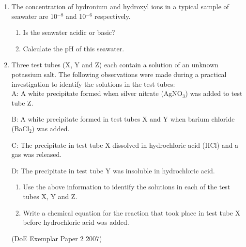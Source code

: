 {\begin{enumerate}
\begin{enumerate}
{(IEB Paper 2, 2003)
}

	\item{The following substances are dissolved in water. Which one of the solutions is basic?

	\begin{enumerate}
	\item{sodium nitrate}
	\item{calcium sulphate}
	\item{ammonium chloride}
	\item{potassium carbonate}
	\end{enumerate}

(IEB Paper 2, 2005)
}
\end{enumerate}


\item{
The concentration of hydronium and hydroxyl ions in a typical sample of seawater are 10$^{-8}$ and 10$^{-6}$ respectively.
	\begin{enumerate}
	\item{Is the seawater acidic or basic?}
	\item{Calculate the pH of this seawater.}
	\end{enumerate}
}

\item{Three test tubes (X, Y and Z) each contain a solution of an unknown potassium salt. The following observations were made during a practical investigation to identify the solutions in the test tubes:\\

A: A white precipitate formed when silver nitrate (AgNO$_{3}$) was added to test tube Z.

B: A white precipitate formed in test tubes X and Y when barium chloride (BaCl$_{2}$) was added.

C: The precipitate in test tube X dissolved in hydrochloric acid (HCl) and a gas was released.

D: The precipitate in test tube Y was insoluble in hydrochloric acid.\\

	\begin{enumerate}
	\item{Use the above information to identify the solutions in each of the test tubes X, Y and Z.}
	\item{Write a chemical equation for the reaction that took place in test tube X before hydrochloric acid was added.}
	\end{enumerate}
(DoE Exemplar Paper 2 2007)

}
\end{enumerate}
}

